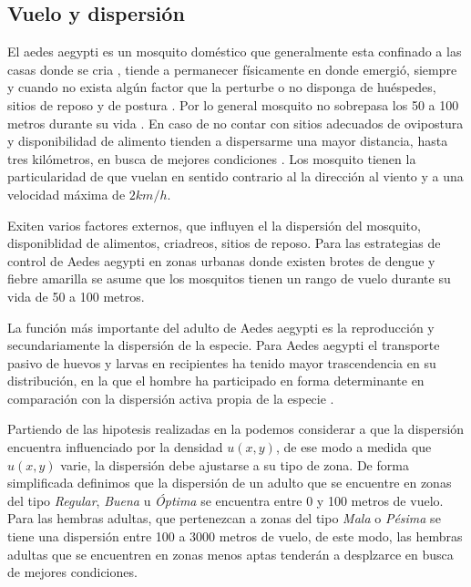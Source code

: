 
\subsection{Vuelo y dispersión}
\label{subsec:cap4-vuelo-dispersion}
El aedes aegypti es un mosquito doméstico que generalmente esta confinado a las casas donde se
cria \citep{luevano1993ciclo}, tiende a permanecer físicamente en donde emergió, siempre y cuando
no exista algún factor que la perturbe o no disponga de huéspedes, sitios de reposo y de postura
\citep{ThironIzcazaJ2003}. Por lo general mosquito no sobrepasa los 50 a 100 metros durante su vida
\citep{cabezas2005dengue}. En caso de no contar con sitios adecuados de ovipostura y disponibilidad
de alimento tienden a dispersarme una mayor distancia, hasta tres kilómetros, en busca de
mejores condiciones \citep{ThironIzcazaJ2003}. Los mosquito tienen la particularidad de que vuelan
en sentido contrario al la dirección al viento \citep{ThironIzcazaJ2003} y a una velocidad máxima
de $2 km/h$\citep{kaufmann2004flight}.

Exiten varios factores externos, que influyen el la dispersión del mosquito, disponiblidad de
alimentos, criadreos, sitios de reposo. Para las estrategias de control de Aedes aegypti en zonas
urbanas donde existen brotes de dengue y fiebre amarilla se asume que los mosquitos tienen un
rango de vuelo durante su vida de 50 a 100 metros\citep{dengueUruguayCap8}.

La función más importante del adulto de Aedes aegypti es la reproducción y secundariamente la
dispersión de la especie. Para Aedes aegypti el transporte pasivo de huevos y larvas en
recipientes ha tenido mayor trascendencia en su distribución, en la que el hombre ha participado
en forma determinante en comparación con la dispersión activa propia de la especie
\citep{ThironIzcazaJ2003}.

Partiendo de las hipotesis realizadas en la  podemos considerar a
que la dispersión encuentra influenciado por la densidad $u(x,y)$, de ese modo a medida que
$u(x,y)$ varie, la dispersión debe ajustarse a su tipo de zona. De forma simplificada definimos que
la dispersión de un adulto que se encuentre en zonas del tipo \textit{Regular}, \textit{Buena} u
\textit{Óptima} se encuentra entre 0 y 100 metros de vuelo. Para las hembras adultas, que
pertenezcan a zonas del tipo \textit{Mala} o \textit{Pésima} se tiene una dispersión entre 100 a
3000 metros de vuelo, de este modo, las hembras adultas que se encuentren en zonas menos aptas
tenderán a desplzarce en busca de mejores condiciones.
